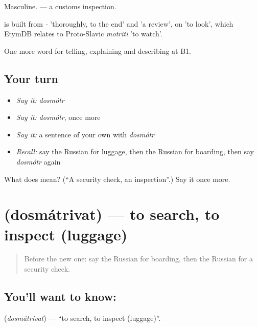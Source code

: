 Masculine. \emph{ } — a customs inspection.

\begin{cousinweb}
\emph{} is built from \emph{-} 'thoroughly, to the end' and \emph{} 'a review', on \emph{} 'to look', which EtymDB relates to Proto-Slavic \emph{motriti} 'to watch'.
\end{cousinweb}

\begin{grammarlens}[title={What you've built}]
One more word for telling, explaining and describing at B1.
\end{grammarlens}

\subsection*{Your turn}
\begin{itemize}
\raggedright
  \item \emph{Say it:} \emph{dosmótr}
  \item \emph{Say it:} \emph{dosmótr}, once more
  \item \emph{Say it:} a sentence of your own with \emph{dosmótr}
  \item \emph{Recall:} say the Russian for luggage, then the Russian for boarding, then say \emph{dosmótr} again
\end{itemize}

\begin{tcolorbox}[breakable,colback=teal!4,colframe=teal!35!black,title={Before you move on}]
What does  mean? (\textquotedblleft{}A security check, an inspection\textquotedblright{}.) Say it once more.
\end{tcolorbox}
\section[\texorpdfstring{\ru{досматривать} (dosmátrivat)}{досматривать (dosmátrivat)}]{ (dosmátrivat) — to search, to inspect (luggage)}

\label{lesson:RU-C420-dosmatrivat}



\begin{quote}
Before the new one: say the Russian for boarding, then the Russian for a security check.
\end{quote}

\subsection*{You'll want to know: }
\textbf{} (\emph{dosmátrivat}) — \textquotedblleft{}to search, to inspect (luggage)\textquotedblright{}.

